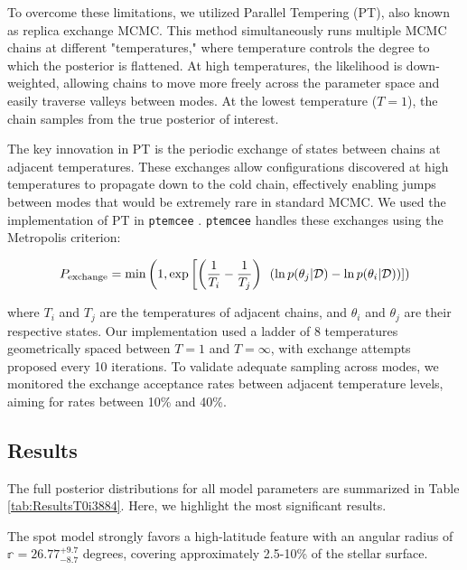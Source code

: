 \documentclass[twocolumn]{aastex631}
\begin{document}
To overcome these limitations, we utilized Parallel Tempering (PT), also known as replica exchange MCMC. 
This method simultaneously runs multiple MCMC chains at different "temperatures," where temperature controls the 
degree to which the posterior is flattened. At high temperatures, the likelihood is down-weighted, allowing chains to 
move more freely across the parameter space and easily traverse valleys between modes. At the lowest temperature 
($T=1$), the chain samples from the true posterior of interest.

The key innovation in PT is the periodic exchange of states between chains at adjacent temperatures. 
These exchanges allow configurations discovered at high temperatures to propagate down to the cold chain, 
effectively enabling jumps between modes that would be extremely rare in standard MCMC. We used the implementation
of PT in \texttt{ptemcee} \citep{ptemcee}. \texttt{ptemcee} handles these exchanges using the Metropolis criterion:

\begin{equation}
    \label{eq:ptemcee}
    P_{\rm exchange} = \min\left(1, \exp\left[\left(\frac{1}{T_i} - \frac{1}{T_j}\right)\right.\right.\left.\left.\left(\ln p(\theta_j|\mathcal{D}) - \ln p(\theta_i|\mathcal{D})\right)\right]\right)
\end{equation}

where $T_i$ and $T_j$ are the temperatures of adjacent chains, and $\theta_i$ and $\theta_j$ are their respective states.
Our implementation used a ladder of 8 temperatures geometrically spaced between $T=1$ and $T=\infty$, with exchange attempts proposed 
every 10 iterations. To validate adequate sampling across modes, we monitored the exchange acceptance rates between adjacent 
temperature levels, aiming for rates between 10\% and 40\%.

\subsection{Results}
The full posterior distributions for all model parameters are summarized in Table \ref{tab:ResultsT0i3884}. Here, we highlight the 
most significant results.

The spot model strongly favors a high-latitude feature with an angular radius of $\mathbb{r} = 26.77^{+9.7}_{-8.7}$ degrees, 
covering approximately 2.5-10\% of the stellar surface. 
\end{document}
